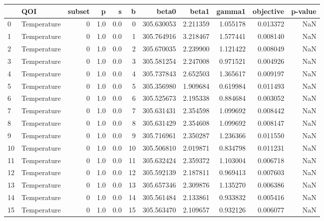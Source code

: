 \begin{tabular}{llrrrrrrrrr}
\toprule
{} &          QOI &  subset &    p &    s &    b &       beta0 &     beta1 &    gamma1 &  objective &  p-value \\
\midrule
0   &  Temperature &       0 &  1.0 &  0.0 &    0 &  305.630053 &  2.211359 &  1.055178 &   0.013372 &      NaN \\
1   &  Temperature &       0 &  1.0 &  0.0 &    1 &  305.764916 &  3.218467 &  1.577441 &   0.008140 &      NaN \\
2   &  Temperature &       0 &  1.0 &  0.0 &    2 &  305.670035 &  2.239900 &  1.121422 &   0.008049 &      NaN \\
3   &  Temperature &       0 &  1.0 &  0.0 &    3 &  305.581254 &  2.247008 &  0.971521 &   0.004926 &      NaN \\
4   &  Temperature &       0 &  1.0 &  0.0 &    4 &  305.737843 &  2.652503 &  1.365617 &   0.009197 &      NaN \\
5   &  Temperature &       0 &  1.0 &  0.0 &    5 &  305.356980 &  1.909684 &  0.619984 &   0.011493 &      NaN \\
6   &  Temperature &       0 &  1.0 &  0.0 &    6 &  305.525673 &  2.195338 &  0.884684 &   0.003052 &      NaN \\
7   &  Temperature &       0 &  1.0 &  0.0 &    7 &  305.631431 &  2.354598 &  1.099692 &   0.008442 &      NaN \\
8   &  Temperature &       0 &  1.0 &  0.0 &    8 &  305.631429 &  2.354608 &  1.099692 &   0.008147 &      NaN \\
9   &  Temperature &       0 &  1.0 &  0.0 &    9 &  305.716961 &  2.350287 &  1.236366 &   0.011550 &      NaN \\
10  &  Temperature &       0 &  1.0 &  0.0 &   10 &  305.506810 &  2.019871 &  0.834798 &   0.011231 &      NaN \\
11  &  Temperature &       0 &  1.0 &  0.0 &   11 &  305.632424 &  2.359372 &  1.103004 &   0.006718 &      NaN \\
12  &  Temperature &       0 &  1.0 &  0.0 &   12 &  305.592139 &  2.187811 &  0.969413 &   0.007603 &      NaN \\
13  &  Temperature &       0 &  1.0 &  0.0 &   13 &  305.657346 &  2.309876 &  1.135270 &   0.006386 &      NaN \\
14  &  Temperature &       0 &  1.0 &  0.0 &   14 &  305.561484 &  2.133861 &  0.933832 &   0.005416 &      NaN \\
15  &  Temperature &       0 &  1.0 &  0.0 &   15 &  305.563470 &  2.109657 &  0.932126 &   0.006077 &      NaN \\

\end{tabular}
